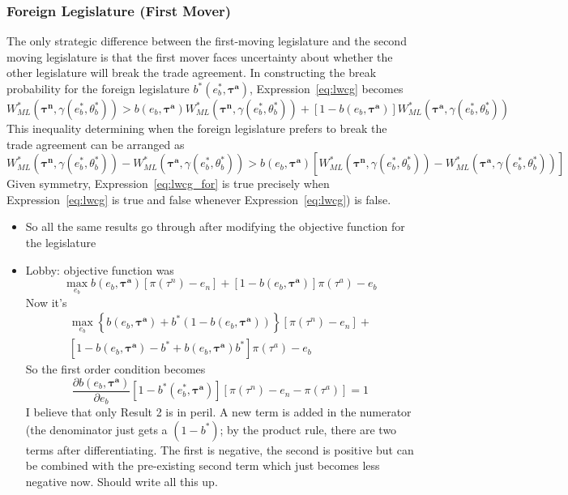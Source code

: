 \documentclass[10pt]{article}
\newcommand{\ve}{\theta}
\newcommand{\bta}{\bm{\tau^a}}
\newcommand{\btn}{\bm{\tau^n}}
\newcommand{\ga}{\gamma}
\begin{document}
\subsubsection{Foreign Legislature (First Mover)}
The only strategic difference between the first-moving legislature and the second moving legislature is that the first mover faces uncertainty about whether the other legislature will break the trade agreement. In constructing the break probability for the foreign legislature $b^*(e_b^*,\bta)$, Expression~\ref{eq:lwcg} becomes
		\[ 
		  W_{ML}^*(\btn,\ga(e_b^*,\ve_b^*)) > b(e_b,\bta) W_{ML}^*\left(\btn,\ga(e_b^*,\ve_b^*)\right) + \left[1-b(e_b,\bta)\right] W_{ML}^*\left(\bta,\ga(e_b^*,\ve_b^*)\right)
		\]
	This inequality determining when the foreign legislature prefers to break the trade agreement can be arranged as 
		\begin{equation}
						  W_{ML}^*(\btn,\ga(e_b^*,\ve_b^*)) - W_{ML}^*(\bta,\ga(e_b^*,\ve_b^*)) > b(e_b,\bta) \left[ W_{ML}^*\left(\btn,\ga(e_b^*,\ve_b^*)\right) - W_{ML}^*\left(\bta,\ga(e_b^*,\ve_b^*)\right) \right]
			\label{eq:lwcg_for}
		\end{equation}
	Given symmetry, Expression~\ref{eq:lwcg_for} is true precisely when Expression~\ref{eq:lwcg} is true and false whenever Expression~\ref{eq:lwcg}) is false. 
				\begin{itemize}
										
					\item	So all the same results go through after modifying the objective function for the legislature
					\item Lobby: objective function was
					  \[
							\max_{e_b} b(e_b,\bta) \left[\pi(\tau^n) - e_n \right] + [1 - b(e_b,\bta)] \pi(\tau^a) - e_b
						\]
						Now it's 
						\begin{multline*}
							\max_{e_b} \left\{ b(e_b,\bta) + b^*(1-b(e_b,\bta)) \right\} \left[\pi(\tau^n) - e_n \right] + \\
							[1 - b(e_b,\bta) - b^* + b(e_b,\bta) b^*] \pi(\tau^a) - e_b
						\end{multline*}
						So the first order condition becomes 
						\begin{equation}
							\frac{\partial b(e_b,\bta)}{\partial e_b} \left[1-b^*(e_b^*,\bta)\right] \left[ \pi(\tau^n) -e_n - \pi(\tau^a) \right] = 1 
						\end{equation}
						I believe that only Result 2 is in peril. A new term is added in the numerator (the denominator just gets a $(1-b^*)$; by the product rule, there are two terms after differentiating. The first is negative, the second is positive but can be combined with the pre-existing second term which just becomes less negative now. Should write all this up.
				\end{itemize}
\end{document}
